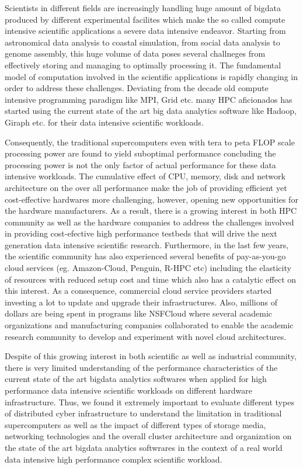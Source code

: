Scientists in different fields are increasingly handling huge amount of bigdata produced by different experimental facilites which make the so called compute intensive scientific applications a severe data intensive endeavor. 
Starting from astronomical data analysis to coastal simulation, from social data analysis to genome assembly, this huge volume of data poses several challneges from effectively storing and managing to optimally processing it.
The fundamental model of computation involved in the scientific applications is rapidly changing in order to address these challenges.
Deviating from the decade old compute intensive programming paradigm like MPI, Grid etc. many HPC aficionados has started using the current state of the art big data analytics software like Hadoop, Giraph etc. for their data intensive scientific workloads.

Consequently, the traditional supercomputers even with tera to peta FLOP scale processing power are found to yield suboptimal performance concluding the processing power is not the only factor of actual performance for these data intensive workloads.
The cumulative effect of CPU, memory, disk and network architecture on the over all performance make the job of providing efficient yet cost-effective hardwares more challenging, however, opening new opportunities for the hardware manufacturers.
As a result, there is a growing interest in both HPC community as well as the hardware companies to address the challenges involved in providing cost-efective high performance testbeds that will drive the next generation data intensive scientific research.
Furthermore, in the last few years, the scientific community has also experienced several benefits of pay-as-you-go cloud services (eg. Amazon-Cloud, Penguin, R-HPC etc) including the  elasticity of resources with reduced setup cost and time which also has a catalytic effect on this interest.
As a consequence, commercial cloud service providers started investing a lot to update and upgrade their infrastructures.
Also, millions of dollars are being spent in programs like NSFCloud where several academic organizations and manufacturing companies collaborated to enable the academic research community to develop and experiment with novel cloud architectures.

Despite of this growing interest in both scientific as well as industrial community, there is very limited understanding of the performance characteristics of the current state of the art bigdata analytics softwares when applied for high performance data intensive scientific workloads on different hardware infrastructure. 
Thus, we found it extremely important to evaluate different types of distributed cyber infrastructure to understand the limitation in traditional supercomputers as well as the impact of different types of storage media, networking technologies and the overall cluster architecture and organization on the state of the art bigdata analytics softwrares in the context of a real world data intensive high performance complex scientific workload.

